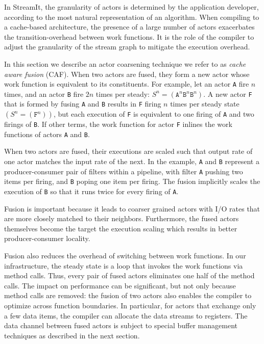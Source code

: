 In StreamIt, the granularity of actors is determined by the
application developer, according to 
the most natural representation of an algorithm. When compiling to a
cache-based architecture, the presence of a  large number of actors
exacerbates the transition-overhead between work functions.
It is the role of the compiler  to adjust the granularity of
the stream graph to mitigate the execution overhead.

In this section we describe an actor coarsening technique we refer to
as {\it cache aware fusion} (CAF). When two actors are fused, they
form a new actor whose work function is equivalent to its constituents.
For example, let an actor \texttt{A} fire $n$
times, and an actor \texttt{B} fire $2n$ times per steady:
$S^n=(\texttt{A}^n\texttt{B}^n\texttt{B}^n)$. A new actor \texttt{F}
that is formed by fusing \texttt{A} and \texttt{B} results in
\texttt{F} firing $n$ times per steady state $(S^n=(\texttt{F}^n))$, but
each execution of \texttt{F} is equivalent to  one 
firing of \texttt{A} and two firings of \texttt{B}. If other terms, the work
function for actor \texttt{F} inlines the work functions of
actors \texttt{A} and \texttt{B}.

When two actors are fused, their executions are scaled such that output
rate of one actor matches the input rate of the next. In the example,
\texttt{A} and \texttt{B} represent a producer-consumer pair of
filters within a pipeline, with filter \texttt{A}  
pushing two items per firing, and \texttt{B} poping one item per
firing. The fusion implicitly scales the execution of \texttt{B} so
that it runs twice for every firing of \texttt{A}.

Fusion is important because it leads to coarser grained actors with
I/O rates that are more closely matched to their
neighbors. Furthermore, the fused actors themselves become the target
the execution scaling which results in better producer-consumer locality.

Fusion also reduces the overhead of switching between
work functions. In our infrastructure, the steady state is a loop that
invokes the work functions via method calls. Thus, every pair of fused
actors eliminates one half of the method calls. The impact on
performance can be significant, but not only because method calls are
removed: the fusion of two actors also enables the compiler to
optimize across function boundaries. In particular, for actors that
exchange only a few data items, the compiler can allocate the data
streams to registers. 
The data channel between fused actors is
subject to special buffer management techniques as described in the
next section.

